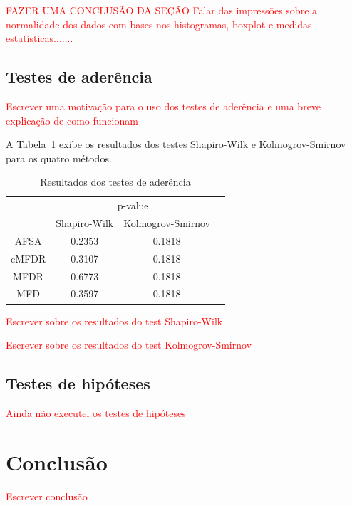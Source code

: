 \documentclass[conference]{IEEEtran}
\begin{document}
\textcolor{red}{FAZER UMA CONCLUSÃO DA SEÇÃO
Falar das impressões sobre a normalidade dos dados com bases nos histogramas, boxplot e medidas estatísticas.......}

\subsection{Testes de aderência}

\textcolor{red}{Escrever uma motivação para o uso dos testes de aderência e uma breve explicação de como funcionam}

A Tabela~\ref{tab:aderencia} exibe os resultados dos testes Shapiro-Wilk e Kolmogrov-Smirnov para os quatro métodos.

\begin{table}[]
	\centering
	\caption{Resultados dos testes de aderência}
	\label{tab:aderencia}
	\begin{tabular}{c|ccc}
		\hline
		& \multicolumn{2}{c}{p-value}      \\
		\cline{2-3}
		& Shapiro-Wilk & Kolmogrov-Smirnov \\
		\hline
		AFSA  & 0.2353       & 0.1818            \\
		cMFDR & 0.3107       & 0.1818            \\
		MFDR  & 0.6773       & 0.1818            \\
		MFD   & 0.3597       &  0.1818               \\
		\hline
	\end{tabular}
\end{table}

\textcolor{red}{Escrever sobre os resultados do test Shapiro-Wilk}

\textcolor{red}{Escrever sobre os resultados do test Kolmogrov-Smirnov}

\subsection{Testes de hipóteses}

\textcolor{red}{Ainda não executei os testes de hipóteses}

\section{Conclusão}
\label{sec:conclusao}

\textcolor{red}{Escrever conclusão}




% 

\end{document}
